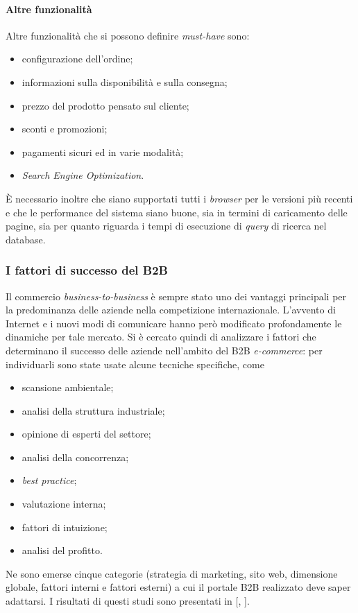 \paragraph{Altre funzionalità}
Altre funzionalità che si possono definire \textit{must-have} sono:
\begin{itemize}
	\item configurazione dell'ordine;
	\item informazioni sulla disponibilità e sulla consegna;
	\item prezzo del prodotto pensato sul cliente;
	\item sconti e promozioni;
	\item pagamenti sicuri ed in varie modalità;
	\item \textit{Search Engine Optimization}.
\end{itemize}
È necessario inoltre che siano supportati tutti i \textit{browser} per le versioni più recenti e che le performance del sistema siano buone, sia in termini di caricamento delle pagine, sia per quanto riguarda i tempi di esecuzione di \textit{query} di ricerca nel database.

\subsubsection{I fattori di successo del B2B}\label{sec:fattori}
Il commercio \textit{business-to-business} è sempre stato uno dei vantaggi principali per la predominanza delle aziende nella competizione internazionale. L'avvento di Internet e i nuovi modi di comunicare hanno però modificato profondamente le dinamiche per tale mercato. Si è cercato quindi di analizzare i fattori che determinano il successo delle aziende nell'ambito del B2B \textit{e-commerce}: per individuarli sono state usate alcune tecniche specifiche, come
\begin{itemize}
	\item scansione ambientale;
	\item analisi della struttura industriale;
	\item opinione di esperti del settore;
	\item analisi della concorrenza;
	\item \textit{best practice};
	\item valutazione interna;
	\item fattori di intuizione;
	\item analisi del profitto.
\end{itemize}Ne sono emerse cinque categorie (strategia di marketing, sito web, dimensione globale, fattori interni e fattori esterni) a cui il portale B2B realizzato deve saper adattarsi. I risultati di questi studi sono presentati in \textit{} [\citeauthor{bib:b2bSuccessFactors}, \citeyear{bib:b2bSuccessFactors}].

